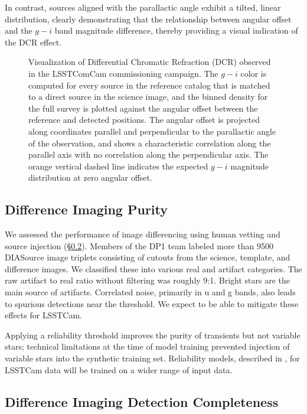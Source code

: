 In contrast, sources aligned with the parallactic angle exhibit a tilted, linear distribution, clearly demonstrating that the relationship between angular offset and the $g-i$ band magnitude difference, thereby providing a visual indication of the \gls{DCR} effect.
\begin{figure}[htb!]
\caption{Visualization of \gls{Differential Chromatic Refraction} (DCR) observed in the LSSTComCam commissioning campaign. The $g-i$ color is computed for every source in the reference catalog that is matched to a direct source in the science image, and the binned density for the full survey is plotted against the angular offset between the reference and detected positions. The angular offset is projected along coordinates parallel and perpendicular to the parallactic angle of the observation, and shows a characteristic correlation along the parallel axis with no correlation along the perpendicular axis. The orange vertical dashed line indicates the expected $g-i$ magnitude distribution at zero angular offset.}
\label{fig:dcr}
\end{figure}


\subsection{Difference Imaging Purity} \label{sec:performance:dia}

We assessed the performance of image differencing using human vetting and source injection (\S \ref{sec:perf:dia_completeness}).
Members of the \gls{DP1} team labeled more than 9500 DIASource image triplets consisting of cutouts from the science, template, and difference images.
We classified these into various real and artifact categories.
The raw artifact to real ratio without filtering was roughly 9:1.
Bright stars are the main source of artifacts.
Correlated noise, primarily in u and g bands, also leads to spurious detections near the threshold.
We expect to be able to mitigate these effects for \gls{LSSTCam}.

Applying a reliability threshold improves the purity of transients but not variable stars; technical limitations at the time of model training prevented injection of variable stars into the synthetic training set.
Reliability models, described in ,  for \gls{LSSTCam} data will be trained on a wider range of input data.

\subsection{Difference Imaging Detection Completeness} \label{sec:perf:dia_completeness}

